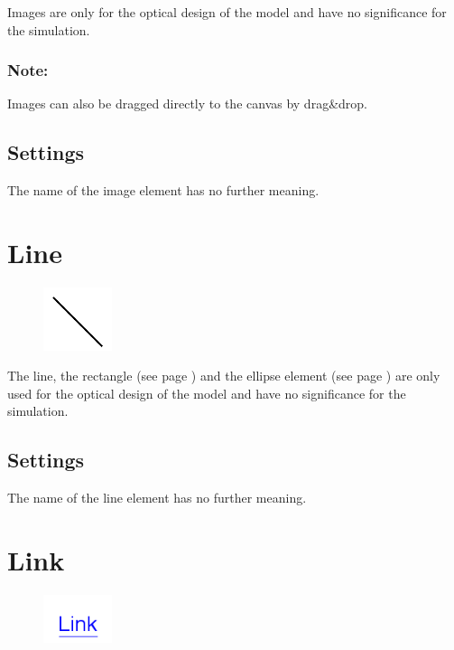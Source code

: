 Images are only for the optical design of the model and have no significance for the simulation.

\subsubsection*{Note:}

Images can also be dragged directly to the canvas by drag\&drop.

\subsection*{Settings}

The name of the image element has no further meaning.


\section{Line}
\label{ref:ModelElementLine}

\begin{figure}
\vspace{-22pt}
\includegraphics[width=2cm]{imageModelElementLine.png}
\vspace{-22pt}
\end{figure}

The line, the rectangle (see page \pageref{ref:ModelElementRectangle}) and the
ellipse element (see page \pageref{ref:ModelElementEllipse}) 
are only used for the optical design of the model and have no significance for the simulation.

\subsection*{Settings}

The name of the line element has no further meaning.


\section{Link}
\label{ref:ModelElementLink}

\begin{figure}
\vspace{-22pt}
\includegraphics[width=2cm]{imageModelElementLink.png}
\vspace{-22pt}
\end{figure}

